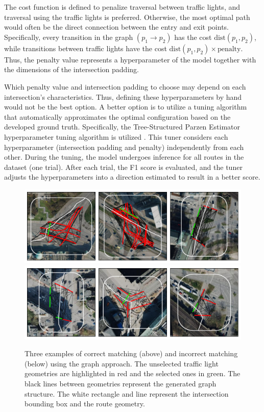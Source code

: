 The cost function is defined to penalize traversal between traffic lights, and traversal using the traffic lights is preferred. Otherwise, the most optimal path would often be the direct connection between the entry and exit points. Specifically, every transition in the graph  $(p_{1} \rightarrow p_{2})$ has the cost $\text{dist}(p_{1}, p_{2})$, while transitions between traffic lights have the cost $\text{dist}(p_{1}, p_{2}) \times \text{penalty}$. Thus, the penalty value represents a hyperparameter of the model together with the dimensions of the intersection padding. 

Which penalty value and intersection padding to choose may depend on each intersection's characteristics. Thus, defining these hyperparameters by hand would not be the best option. A better option is to utilize a tuning algorithm that automatically approximates the optimal configuration based on the developed ground truth. Specifically, the Tree-Structured Parzen Estimator hyperparameter tuning algorithm is utilized \cite{ozaki_multiobjective_2020}. This tuner considers each hyperparameter (intersection padding and penalty) independently from each other. During the tuning, the model undergoes inference for all routes in the dataset (one trial). After each trial, the F1 score is evaluated, and the tuner adjusts the hyperparameters into a direction estimated to result in a better score.

\begin{figure}[t]
\centering
\includegraphics[width=\linewidth]{images/matching-dijkstra-correct.pdf} 
\\
\includegraphics[width=\linewidth]{images/matching-dijkstra-incorrect.pdf}
\caption{Three examples of correct matching (above) and incorrect matching (below) using the graph approach. The unselected traffic light geometries are highlighted in red and the selected ones in green. The black lines between geometries represent the generated graph structure. The white rectangle and line represent the intersection bounding box and the route geometry.}
\label{fig:sg-selection-graph-example}
\end{figure}

